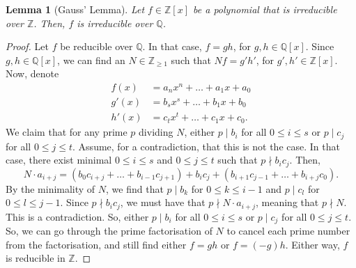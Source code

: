 \documentclass[a4paper, openany]{memoir}
\theoremstyle{definition}
\theoremstyle{plain}
\newtheorem{lemma}[definition]{Lemma}
\begin{document}
    \begin{lemma}[Gauss' Lemma]
        Let $f \in \mathbb{Z}[x]$ be a polynomial that is irreducible over $\mathbb{Z}$. Then, $f$ is irreducible over $\mathbb{Q}$.
    \end{lemma}
    \begin{proof}
        Let $f$ be reducible over $\mathbb{Q}$. In that case, $f = gh$, for $g, h \in \mathbb{Q}[x]$. Since $g, h \in \mathbb{Q}[x]$, we can find an $N \in \mathbb{Z}_{\geq 1}$ such that $Nf = g' h'$, for $g', h' \in \mathbb{Z}[x]$. Now, denote
        \begin{align*}
            f(x) &= a_n x^n + \dots + a_1 x + a_0 \\
            g'(x) &= b_s x^s + \dots + b_1 x + b_0 \\
            h'(x) &= c_t x^t + \dots + c_1 x + c_0.
        \end{align*}
        We claim that for any prime $p$ dividing $N$, either $p \mid b_i$ for all $0 \leq i \leq s$ or $p \mid c_j$ for all $0 \leq j \leq t$. Assume, for a contradiction, that this is not the case. In that case, there exist minimal $0 \leq i \leq s$ and $0 \leq j \leq t$ such that $p \nmid b_i c_j$. Then,
        \[N \cdot a_{i+j} = (b_0 c_{i+j} + \dots + b_{i-1} c_{j+1}) + b_i c_j + (b_{i+1} c_{j-1} + \dots + b_{i+j} c_0).\]
        By the minimality of $N$, we find that $p \mid b_k$ for $0 \leq k \leq i-1$ and $p \mid c_l$ for $0 \leq l \leq j-1$. Since $p \nmid b_i c_j$, we must have that $p \nmid N \cdot a_{i+j}$, meaning that $p \nmid N$. This is a contradiction. So, either $p \mid b_i$ for all $0 \leq i \leq s$ or $p \mid c_j$ for all $0 \leq j \leq t$. So, we can go through the prime factorisation of $N$ to cancel each prime number from the factorisation, and still find either $f = gh$ or $f = (-g)h$. Either way, $f$ is reducible in $\mathbb{Z}$.
    \end{proof}
\end{document}
